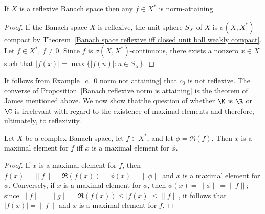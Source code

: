\begin{proposition}\label{Banach reflexive norm is attaining}
If $X$ is a reflexive Banach space then any $f\in X^*$ is norm-attaining.
\end{proposition}
\begin{proof}
If the Banach space $X$ is reflexive, the unit sphere $S_X$ of $X$ is $\sigma(X,X^*)$-compact by Theorem~\ref{Banach space reflexive iff closed unit ball weakly compact}. Let $f\in X^*$, $f\neq 0$. Since $f$ is $\sigma(X,X^*)$-continuous, there exists a nonzero $x\in X$ such that $|f(x)|=\max\{|f(u)|:u\in S_X\}$.
\end{proof}
It follows from Example~\ref{c_0 norm not attaining} that $c_0$ is not reflexive. The converse of Proposition~\ref{Banach reflexive norm is attaining} is the theorem of James mentioned above. We now show thatthe question of whether $\K$ is $\R$ or $\C$ is irrelevant with regard to the existence of maximal elements and therefore, ultimately, to reflexivity.
\begin{proposition}
Let $X$ be a complex Banach space, let $f\in X^*$, and let $\phi=\Re(f)$. Then $x$ is a maximal element for $f$ iff $x$ is a maximal element for $\phi$.
\end{proposition}
\begin{proof}
If $x$ is a maximal element for $f$, then $f(x)=\|f\|=\Re(f(x))=\phi(x)=\|\phi\|$ and $x$ is a maximal element for $\phi$. Conversely, if $x$ is a maximal element for $\phi$, then $\phi(x)=\|\phi\|=\|f\|$; since $\|f\|=\|g\|=\Re(f(x))\leq|f(x)|\leq\|f\|$, it follows that $|f(x)|=\|f\|$ and $x$ is a maximal element for $f$.
\end{proof}